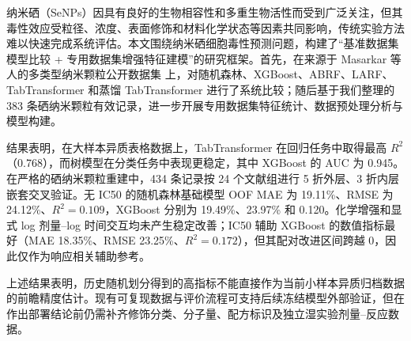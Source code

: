纳米硒（SeNPs）因具有良好的生物相容性和多重生物活性而受到广泛关注，但其毒性效应受粒径、浓度、表面修饰和材料化学状态等因素共同影响，传统实验方法难以快速完成系统评估。本文围绕纳米硒细胞毒性预测问题，构建了“基准数据集模型比较 + 专用数据集增强特征建模”的研究框架。首先，在来源于 Masarkar 等人的多类型纳米颗粒公开数据集 \cite{masarkar2024} 上，对随机森林、XGBoost、ABRF、LARF、TabTransformer 和蒸馏 TabTransformer 进行了系统比较；随后基于我们整理的 383 条硒纳米颗粒有效记录，进一步开展专用数据集特征统计、数据预处理分析与模型构建。

结果表明，在大样本异质表格数据上，TabTransformer 在回归任务中取得最高 $R^2$（0.768），而树模型在分类任务中表现更稳定，其中 XGBoost 的 AUC 为 0.945。在严格的硒纳米颗粒重建中，434 条记录按 24 个文献组进行 5 折外层、3 折内层嵌套交叉验证。无 IC50 的随机森林基础模型 OOF MAE 为 19.11\%、RMSE 为 24.12\%、$R^2=0.109$，XGBoost 分别为 19.49\%、23.97\% 和 0.120。化学增强和显式 log 剂量--log 时间交互均未产生稳定改善；IC50 辅助 XGBoost 的数值指标最好（MAE 18.35\%、RMSE 23.25\%、$R^2=0.172$），但其配对改进区间跨越 0，因此仅作为响应相关辅助参考。

上述结果表明，历史随机划分得到的高指标不能直接作为当前小样本异质归档数据的前瞻精度估计。现有可复现数据与评价流程可支持后续冻结模型外部验证，但在作出部署结论前仍需补齐修饰分类、分子量、配方标识及独立湿实验剂量--反应数据。
